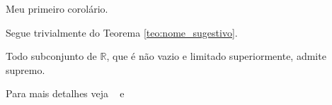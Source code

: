 \begin{coro}
  Meu primeiro corolário.
\end{coro}

\begin{dem}
  Segue trivialmente do Teorema \ref{teo:nome_sugestivo}.
\end{dem}

\begin{axioma}
  Todo subconjunto de $\mathbb{R}$, que é não vazio e limitado
  superiormente, admite supremo.
\end{axioma}

Para mais detalhes veja ~\cite[p. nn]{Lvr} e ~\cite{Art}

